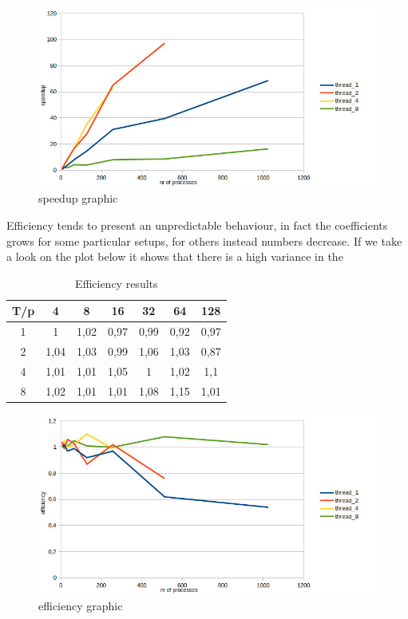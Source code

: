 \documentclass[10pt]{article}
\begin{document}
\begin{multicols}{2}
\begin{figure}[H]
  \includegraphics[scale=0.3]{img/speedup.jpg}
  \centering
  \caption{speedup graphic}
\end{figure}

\noindent 
Efficiency tends to present an unpredictable behaviour,
in fact the coefficients grows for some particular setups,
for others instead numbers decrease. If we take a look on
the plot below it shows that there is a high variance in the
\begin{table}[H]
\centering
\begin{tabular}{| c | c | c | c | c | c | c |}
  \hline
  T/p & 4	 & 8	& 16	& 32	& 64 & 128  \\
  \hline
  1 & 1	& 1,02 & 0,97 & 0,99 & 0,92 & 0,97  \\
  2 & 1,04 & 1,03 & 0,99 & 1,06 & 1,03 & 0,87 \\	
  4 & 1,01	&1,01&	1,05&	1&	1,02&	1,1	\\	
  8 &1,02&	1,01&	1,01&	1,08&	1,15&	1,01 \\
  \hline
\end{tabular}
\caption{Efficiency results}
\label{efficiency_results}
\end{table}

\begin{figure}[H]
  \includegraphics[scale=0.3]{img/efficiency.jpg}
  \centering
  \caption{efficiency graphic}
\end{figure}



\end{multicols}
\end{document}
